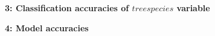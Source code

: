 \documentclass[a4paper, 12pt, titlepage]{scrartcl}
\begin{document}
\newpage


\textbf{\large 3: Classification accuracies of $treespecies$ variable}


\newpage


\textbf{\large 4: Model accuracies}\\

\newpage




\end{document}
